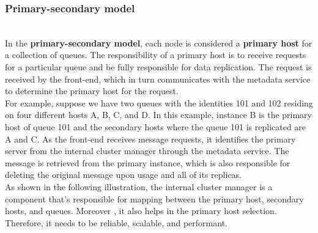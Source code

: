 \begin{table}[htbp]
\centering
\small
{}
\caption{Internal versus External Cluster Managers}
\end{table}

\subsubsection{Primary-secondary model}\label{2jhuGj8BnWvv79VMZrmhk}
\\
In the \textbf{primary-secondary model}, each node is considered a \textbf{primary host} for a collection of queues. The responsibility of a primary host is to receive requests for a particular queue and be fully responsible for data replication. The request is received by the front-end, which in turn communicates with the metadata service to determine the primary host for the request.
\\
For example, suppose we have two queues with the identities 101 and 102 residing on four different hosts A, B, C, and D. In this example, instance B is the primary host of queue 101 and the secondary hosts where the queue 101 is replicated are A and C. As the front-end receives message requests, it identifies the primary server from the internal cluster manager through the metadata service. The message is retrieved from the primary instance, which is also responsible for deleting the original message upon usage and all of its replicas.
\\
As shown in the following illustration, the internal cluster manager is a component that's responsible for mapping between the primary host, secondary hosts, and queues. Moreover , it also helps in the primary host selection. Therefore, it needs to be reliable, scalable, and performant.

